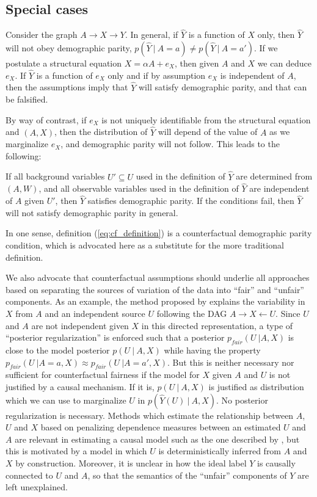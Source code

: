 \subsection{Special cases}

Consider the graph $A \rightarrow X \rightarrow Y$. In general, if $\hat Y$ is a function of $X$ only, then $\hat Y$ will not obey demographic parity, $p(\hat Y\ |\ A = a) \neq p(\hat Y\ |\ A = a')$.  If we postulate a structural equation $X = \alpha A + e_X$, then given $A$ and $X$ we can deduce $e_X$. If $\hat Y$ is a function of $e_X$ only and if by assumption $e_X$ is independent of $A$, then the assumptions imply that $\hat Y$ will satisfy demographic parity, and that can be falsified.

By way of contrast, if $e_X$ is not uniquely identifiable from the structural equation and $(A, X)$, then the distribution of $\hat Y$ will depend of the value of $A$ as we marginalize $e_X$, and demographic parity will not follow. This leads to the following:

\begin{lem}
If all background variables $U' \subseteq U$ used in the definition of $\hat Y$ are determined from $(A, W)$, and all observable variables used in the definition of $\hat Y$ are independent of $A$ given $U'$, then $\hat Y$ satisfies demographic parity. If the conditions fail, then $\hat Y$ will not satisfy demographic parity in general. 
\end{lem}
  
In one sense, definition (\ref{eq:cf_definition}) is a counterfactual demographic parity condition, which is advocated here as a substitute for the more traditional definition.

We also advocate that counterfactual assumptions should underlie all approaches based on separating the sources of variation of the data into ``fair'' and ``unfair'' components. As an example, the method proposed by \cite{louizos2015variational} explains the variability in $X$ from $A$ and an independent source $U$ following the DAG $A \rightarrow X \leftarrow U$. Since $U$ and $A$ are not independent given $X$ in this directed representation, a type of ``posterior regularization'' \citep{ganchev:10} is enforced such that a posterior $p_{fair}(U\ | A, X)$ is close to the model posterior $p(U\ |\ A, X)$ while having the property $p_{fair}(U\ | A = a, X) \approx p_{fair}(U\ | A = a', X)$. But this is neither necessary nor sufficient for counterfactual fairness if the model for $X$ given $A$ and $U$ is not justified by a causal mechanism. If it is, $p(U\ |\ A, X)$ is justified as distribution which we can use to marginalize $U$ in $p(\hat Y(U)\ |\ A, X)$. No posterior regularization is necessary.  Methods which estimate the relationship between $A$, $U$ and $X$ based on penalizing dependence measures between an estimated $U$ and $A$ are relevant in estimating a causal model such as the one described by \citep{mooij:09}, but this is motivated by a model in which $U$ is deterministically inferred from $A$ and $X$ by construction. Moreover, it is unclear in \cite{louizos2015variational} how the ideal label $Y$ is causally connected to $U$ and $A$, so that the semantics of the ``unfair''
components of $Y$ are left unexplained.


